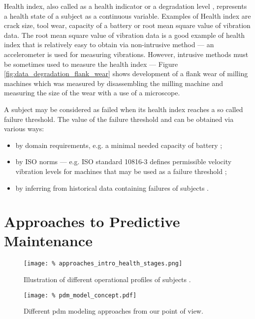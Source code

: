 Health index, also called as a health indicator or a degradation level \cite{lei2018machinery}, represents a health state of a subject as a continuous variable.
Examples of Health index are crack size, tool wear, capacity of a battery or root mean square value of vibration data.
The root mean square value of vibration data is a good example of health index that is relatively easy to obtain via non-intrusive method --- an accelerometer is used for measuring vibrations.
However, intrusive methods must be sometimes used to measure the health index --- Figure \ref{fig:data_degradation_flank_wear} shows development of a flank wear of milling machines which was measured by disassembling the milling machine and measuring the size of  the wear with a use of a microscope.

A subject may be considered as failed when its health index reaches a so called failure threshold.
The value of the failure threshold and can be obtained via various ways:
\begin{itemize}
    \item by domain requirements, e.g. a minimal needed capacity of battery         
          \cite{data_set_battery};
    \item by ISO norms --- e.g. ISO standard 10816-3 defines permissible velocity vibration
          levels for machines that may be used as a failure threshold
          \cite{klausen2018novel, iso_mechanical};
    \item by inferring from historical data containing failures of subjects         
          \cite{chen2017statistical, wei2013multi}.
\end{itemize}

\section{Approaches to Predictive Maintenance}
\label{sec:pdm_approaches}

\begin{figure}
    \centering
    \texttt{[image: \%
        approaches\_intro\_health\_stages.png]}
    \caption{Illustration of different operational profiles of subjects \cite{lei2018machinery}.}
    \label{fig:approaches_intro_health_stages}
\end{figure}

\begin{figure}
    \centering
    \texttt{[image: \%
        pdm\_model\_concept.pdf]}
    \caption{Different \gls{pdm} modeling approaches from our point of view.}
    \label{fig:pdm_model_concept}
\end{figure}

